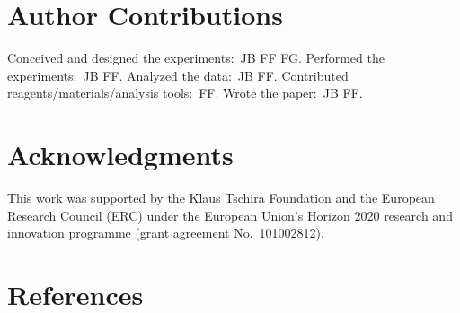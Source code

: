 \documentclass[
  twocolumn]{biophys-new-mod}
\begin{document}
\hypertarget{author-contributions}{%
\section{Author Contributions}\label{author-contributions}}

Conceived and designed the experiments:~JB FF FG. Performed the
experiments:~JB FF. Analyzed the data:~JB FF. Contributed
reagents/materials/analysis tools:~FF. Wrote the paper:~JB FF.

\hypertarget{acknowledgments}{%
\section{Acknowledgments}\label{acknowledgments}}

This work was supported by the Klaus Tschira Foundation and the European Research Council
(ERC) under the European Union's Horizon 2020 research and innovation
programme (grant agreement No.~101002812).

\hypertarget{references}{%
\section{References}\label{references}}
\end{document}
